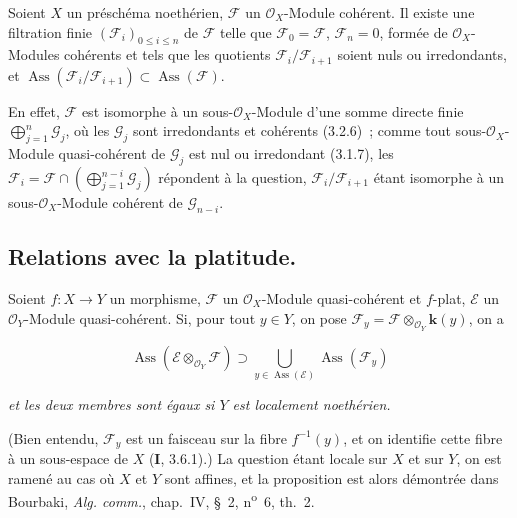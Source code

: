 \begin{corollary}[3.2.8]
\label{IV.2.3.2.8-fr}
Soient $X$ un préschéma noethérien, $\mathcal F$ un $\mathcal O_X$-Module
cohérent. Il existe une filtration finie $(\mathcal F_i)_{0\le i\le n}$ de
$\mathcal F$ telle que $\mathcal F_0=\mathcal F$, $\mathcal F_n=0$, formée de
$\mathcal O_X$-Modules cohérents et tels que les quotients
$\mathcal F_i/\mathcal F_{i+1}$ soient nuls ou irredondants, et
$\operatorname{Ass}(\mathcal F_i/\mathcal F_{i+1})
\subset\operatorname{Ass}(\mathcal F)$.
\end{corollary}

En effet, $\mathcal F$ est isomorphe à un sous-$\mathcal O_X$-Module d'une
somme directe finie $\bigoplus_{j=1}^n\mathcal G_j$, où les $\mathcal G_j$
sont irredondants et cohérents (3.2.6)~; comme tout sous-$\mathcal O_X$-Module
quasi-cohérent de $\mathcal G_j$ est nul ou irredondant (3.1.7), les
$\mathcal F_i=\mathcal F\cap(\bigoplus_{j=1}^{n-i}\mathcal G_j)$ répondent à
la question, $\mathcal F_i/\mathcal F_{i+1}$ étant isomorphe à un
sous-$\mathcal O_X$-Module cohérent de $\mathcal G_{n-i}$.

\subsection{Relations avec la platitude.}

\begin{proposition}[3.3.1]
Soient $f:X\to Y$ un morphisme, $\mathcal F$ un $\mathcal O_X$-Module
quasi-cohérent et $f$-plat, $\mathcal E$ un $\mathcal O_Y$-Module
quasi-cohérent. Si, pour tout $y\in Y$, on pose
$\mathcal F_y=\mathcal F\otimes_{\mathcal O_Y}\boldsymbol{k}(y)$, on a
\end{proposition}

\begin{env}[3.3.1.1]
\label{IV.2.3.3.1.1-fr}
\[
\operatorname{Ass}(\mathcal E\otimes_{\mathcal O_Y}\mathcal F)
\supset\bigcup_{y\in\operatorname{Ass}(\mathcal E)}
\operatorname{Ass}(\mathcal F_y)
\]
\end{env}

\emph{et les deux membres sont égaux si $Y$ est localement noethérien.}

(Bien entendu, $\mathcal F_y$ est un faisceau sur la fibre $f^{-1}(y)$, et on
identifie cette fibre à un sous-espace de $X$ (\textbf{I}, 3.6.1).) La question étant
locale sur $X$ et sur $Y$, on est ramené au cas où $X$ et $Y$ sont affines,
et la proposition est alors démontrée dans Bourbaki, \emph{Alg. comm.},
chap.~IV, \S~2, n\textsuperscript{o}~6, th.~2.

